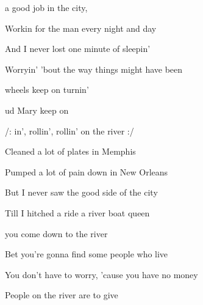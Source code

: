 


\zs
{} a good job in the city,

Workin for the man every night and day

And I never lost one minute of sleepin'

Worryin' 'bout the way things might have been
\ks

\zr
{} wheels keep on turnin'

ud  Mary keep on 

/: in', rollin', rollin' on the river :/
\kr

\zs
{Cleaned} a lot of plates in Memphis

Pumped a lot of pain down in New Orleans

But I never saw the good side of the city

Till I hitched a ride  a river boat queen
\ks

\zr
\kr

\zs
{} you come down to the river

Bet you're gonna find some people who live

You don't have to worry, 'cause you have no money

People on the river are  to give
\ks

\zr\kr

\kp




